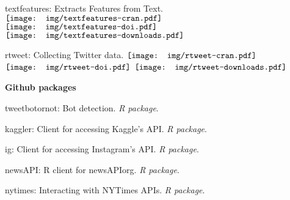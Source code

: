 \begin{innerlist}
      \item textfeatures: Extracts Features from Text.
\href{https://cran.r-project.org/package=textfeatures}{$\vcenter{\hbox{\texttt{[image: img/textfeatures-cran.pdf]}}}$}
      \href{https://doi.org/10.5281/zenodo.2528493}{$\vcenter{\hbox{\texttt{[image: img/textfeatures-doi.pdf]}}}$}
                                                    $\vcenter{\hbox{\texttt{[image: img/textfeatures-downloads.pdf]}}}$

      \item rtweet: Collecting Twitter data.
   \href{https://cran.r-project.org/package=rtweet}{$\vcenter{\hbox{\texttt{[image: img/rtweet-cran.pdf]}}}$}
      \href{https://doi.org/10.5281/zenodo.2528481}{$\vcenter{\hbox{\texttt{[image: img/rtweet-doi.pdf]}}}$}
                                                    $\vcenter{\hbox{\texttt{[image: img/rtweet-downloads.pdf]}}}$

    \end{innerlist}\vspace{1em}

  \textbf{Github packages}
    \begin{innerlist}
      \item tweetbotornot: Bot detection. \textit{R package}. \href{https://github.com/mkearney/tweetbotornot}{\faExternalLink}
      \item kaggler: Client for accessing Kaggle’s API. \textit{R package}. \href{https://github.com/mkearney/kaggler}{\faExternalLink}
      \item ig: Client for accessing Instagram's API. \textit{R package}. \href{https://github.com/mkearney/ig}{\faExternalLink}
      \item newsAPI: R client for newsAPIorg. \textit{R package}. \href{https://github.com/mkearney/newsAPI}{\faExternalLink}
      \item nytimes: Interacting with NYTimes APIs. \textit{R package}. \href{https://github.com/mkearney/nytimes}{\faExternalLink}
    \end{innerlist}\vspace{1em}

